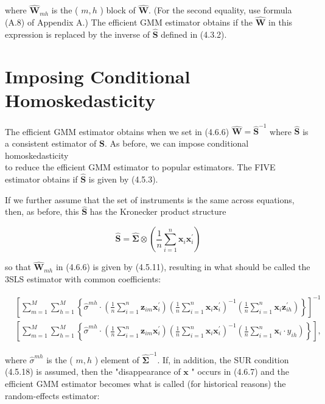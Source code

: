 \documentclass[10pt]{article}
\begin{document}
where $\widehat{\mathbf{W}}_{m h}$ is the ( $m, h$ ) block of $\widehat{\mathbf{W}}$. (For the second equality, use formula (A.8) of Appendix A.) The efficient GMM estimator obtains if the $\widehat{\mathbf{W}}$ in this expression is replaced by the inverse of $\widehat{\mathbf{S}}$ defined in (4.3.2).

\section*{Imposing Conditional Homoskedasticity}
The efficient GMM estimator obtains when we set in (4.6.6) $\widehat{\mathbf{W}}=\widehat{\mathbf{S}}^{-1}$ where $\widehat{\mathbf{S}}$ is a consistent estimator of $\mathbf{S}$. As before, we can impose conditional homoskedasticity\\
to reduce the efficient GMM estimator to popular estimators. The FIVE estimator obtains if $\widehat{\mathbf{S}}$ is given by (4.5.3).

If we further assume that the set of instruments is the same across equations, then, as before, this $\widehat{\mathbf{S}}$ has the Kronecker product structure

$$
\widehat{\mathbf{S}}=\widehat{\mathbf{\Sigma}} \otimes\left(\frac{1}{n} \sum_{i=1}^{n} \mathbf{x}_{i} \mathbf{x}_{i}^{\prime}\right)
$$

so that $\widehat{\mathbf{W}}_{m h}$ in (4.6.6) is given by (4.5.11), resulting in what should be called the 3SLS estimator with common coefficients:


\begin{align*}
& {\left[\sum_{m=1}^{M} \sum_{h=1}^{M}\left\{\hat{\sigma}^{m h} \cdot\left(\frac{1}{n} \sum_{i=1}^{n} \mathbf{z}_{i m} \mathbf{x}_{i}^{\prime}\right)\left(\frac{1}{n} \sum_{i=1}^{n} \mathbf{x}_{i} \mathbf{x}_{i}^{\prime}\right)^{-1}\left(\frac{1}{n} \sum_{i=1}^{n} \mathbf{x}_{i} \mathbf{z}_{i h}^{\prime}\right)\right\}\right]^{-1}} \\
& {\left[\sum_{m=1}^{M} \sum_{h=1}^{M}\left\{\hat{\sigma}^{m h} \cdot\left(\frac{1}{n} \sum_{i=1}^{n} \mathbf{z}_{i m} \mathbf{x}_{i}^{\prime}\right)\left(\frac{1}{n} \sum_{i=1}^{n} \mathbf{x}_{i} \mathbf{x}_{i}^{\prime}\right)^{-1}\left(\frac{1}{n} \sum_{i=1}^{n} \mathbf{x}_{i} \cdot y_{i h}\right)\right\}\right],} \tag{4.6.7}
\end{align*}


where $\hat{\sigma}^{m h}$ is the ( $m, h$ ) element of $\widehat{\mathbf{\Sigma}}^{-1}$. If, in addition, the SUR condition (4.5.18) is assumed, then the "disappearance of $\mathbf{x}$ " occurs in (4.6.7) and the efficient GMM estimator becomes what is called (for historical reasons) the random-effects estimator:
\end{document}
